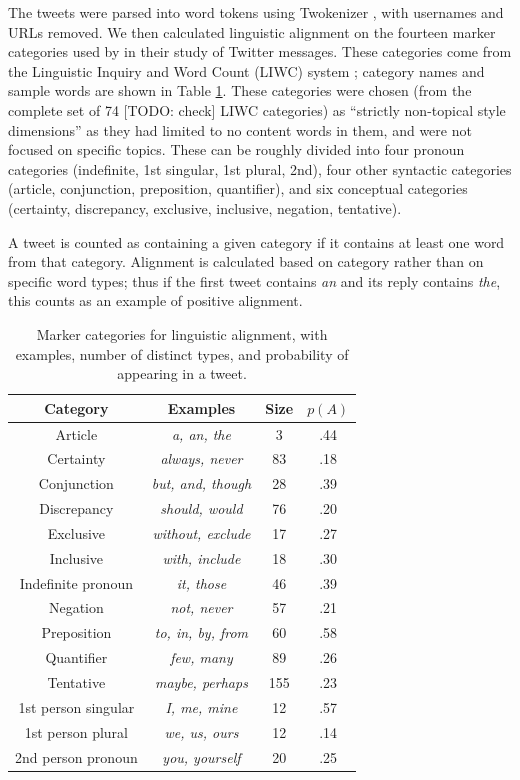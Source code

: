 \documentclass{acm_proc_article-sp}
\begin{document}
The tweets were parsed into word tokens using Twokenizer \cite{OwoputiEtAl2013}, with usernames and URLs removed.  We then calculated linguistic alignment on the fourteen marker categories used by \cite{DNMGamonDumais2011} in their study of Twitter messages.  These categories come from the Linguistic Inquiry and Word Count (LIWC) system \cite{LIWC}; category names and sample words are shown in Table \ref{tab:LIWC}. These categories were chosen (from the complete set of 74 [TODO: check] LIWC categories) as ``strictly non-topical style dimensions'' as they had limited to no content words in them, and were not focused on specific topics.  These can be roughly divided into four pronoun categories (indefinite, 1st singular, 1st plural, 2nd), four other syntactic categories (article, conjunction, preposition, quantifier), and six conceptual categories (certainty, discrepancy, exclusive, inclusive, negation, tentative).

A tweet is counted as containing a given category if it contains at least one word from that category.  Alignment is calculated based on category rather than on specific word types; thus if the first tweet contains \textit{an} and its reply contains \textit{the}, this counts as an example of positive alignment.

\begin{table}
\centering
\caption{Marker categories for linguistic alignment, with examples, number of distinct types, and probability of appearing in a tweet.}\label{tab:LIWC}
\begin{tabular}{|c|c|c|c|} \hline
Category & Examples & Size & $p(A)$\\ \hline
Article & \textit{a, an, the} & 3 & .44 \\
Certainty  & \textit{always, never} & 83 & .18 \\
Conjunction  & \textit{but, and, though} & 28 & .39\\
Discrepancy  & \textit{should, would} & 76 & .20 \\
Exclusive  & \textit{without, exclude} & 17 & .27\\
Inclusive  & \textit{with, include} & 18 & .30\\
Indefinite pronoun  & \textit{it, those} & 46 & .39\\
Negation  & \textit{not, never} & 57 & .21\\
Preposition  & \textit{to, in, by, from} & 60 & .58\\
Quantifier  & \textit{few, many} & 89 & .26\\
Tentative & \textit{maybe, perhaps} & 155 & .23\\
1st person singular  & \textit{I, me, mine} & 12 & .57\\
1st person plural & \textit{we, us, ours} & 12 & .14\\
2nd person pronoun   & \textit{you, yourself} & 20 & .25\\
\hline\end{tabular}
\end{table}
\end{document}
